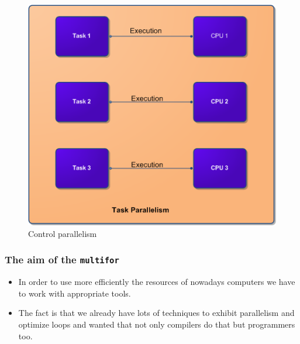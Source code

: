 \documentclass{beamer}
\begin{document}
\begin{frame}
\begin{figure}[h!]
\begin{minipage}[t]{0.40\textwidth}
        \centering
        \includegraphics[width=\textwidth]{pictures/task-parallelism}
        \caption{Control parallelism}

        \end{minipage}

        \end{figure}

        \end{frame}


        \begin{frame}
        \frametitle{The aim of the \texttt{multifor}}

        \begin{itemize}

        \item In order to use more efficiently the resources of nowadays computers we have to work with appropriate tools.

        \item The fact is that we already have lots of techniques to exhibit parallelism and optimize loops and wanted that not only compilers do that but programmers too.

        \end{itemize}

        \end{frame}

\end{document}
